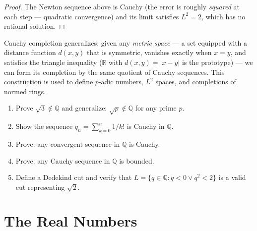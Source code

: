 \documentclass[12pt, openany]{book}
\theoremstyle{plain}
\theoremstyle{definition}
\theoremstyle{remark}
\newcommand{\Q}{\mathbb{Q}}
\newcommand{\R}{\mathbb{R}}
\begin{document}
\begin{proof}
The Newton sequence above is Cauchy (the error is roughly \emph{squared} at each step --- quadratic convergence) and its limit satisfies $L^2 = 2$, which has no rational solution.
\end{proof}

\begin{remarkbox}
Cauchy completion generalizes: given any \emph{metric space} --- a set equipped with a distance function $d(x,y)$ that is symmetric, vanishes exactly when $x = y$, and satisfies the triangle inequality ($\R$ with $d(x,y) = |x-y|$ is the prototype) --- we can form its completion by the same quotient of Cauchy sequences. This construction is used to define $p$-adic numbers, $L^2$ spaces, and completions of normed rings.
\end{remarkbox}
\color{black}

\begin{exbox}
\begin{enumerate}
  \item Prove $\sqrt{3} \notin \Q$ and generalize: $\sqrt{p} \notin \Q$ for any prime $p$.
  \item Show the sequence $q_n = \sum_{k=0}^n 1/k!$ is Cauchy in $\Q$.
  \item Prove: any convergent sequence in $\Q$ is Cauchy.
  \item Prove: any Cauchy sequence in $\Q$ is bounded.
  \item Define a Dedekind cut and verify that $L = \{q \in \Q : q < 0 \lor q^2 < 2\}$ is a valid cut representing $\sqrt{2}$.
\end{enumerate}
\end{exbox}
\color{black}

\chapter{The Real Numbers}
\color{black}
\end{document}
